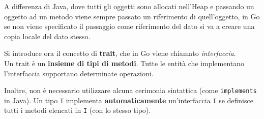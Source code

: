 \documentclass{article}
\begin{document}
A differenza di Java, dove tutti gli oggetti sono allocati nell'Heap e passando un oggetto ad un metodo viene sempre passato un riferimento di quell'oggetto, in Go se non viene specificato il passaggio come riferimento del dato si va a creare una copia locale del dato stesso.

\pagebreak

Si introduce ora il concetto di \textbf{trait}, che in Go viene chiamato \textit{interfaccia}.\\
Un trait è un \textbf{insieme di tipi di metodi}. Tutte le entità che implementano l'interfaccia supportano determinate operazioni. 

Inoltre, non è necessario utilizzare alcuna cerimonia sintattica (come \texttt{implements} in Java). Un tipo \texttt{T} implementa \textbf{automaticamente} un'interfaccia \texttt{I} se definisce tutti i metodi elencati in \texttt{I} (con lo stesso tipo).
\end{document}
